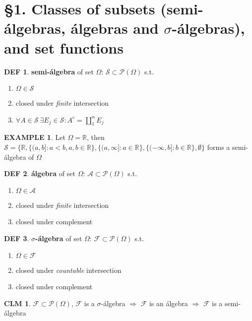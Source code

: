 \documentclass[hidelinks]{article}
\theoremstyle{definition}
\newtheorem*{defin}{DEF}
\newtheorem*{eg}{EXAMPLE}
\theoremstyle{dotless}
\newtheorem{claim}{CLM}[section]
\theoremstyle{remark}
\begin{document}
\newpage
\section*{\S1. Classes of subsets (semi-álgebras, álgebras and $\sigma$-álgebras), and set functions}
\setcounter{section}{1}

\begin{defin}
\textbf{semi-álgebra} of set $\Omega$: $\mathscr{S}\subset\mathscr{P}(\Omega)$ s.t.
\begin{enumerate}[label=\arabic*\degree]
    \item $\Omega\in\mathscr{S}$
    \item closed under \emph{finite} intersection
    \item $\forall A\in\mathscr{S}\ \exists E_j\in\mathscr{S}:A^c=\coprod\limits_1^nE_j$
\end{enumerate}
\end{defin}

\begin{eg}
Let $\Omega=\mathbb{R}$, then $\mathscr{S}=\{\mathbb{R},\{(a,b]:a<b,a,b\in \mathbb{R}\},\{(a,\infty]:a\in \mathbb{R}\},\{(-\infty,b]:b\in\mathbb{R}\},\emptyset\}$ forms a semi-álgebra of $\Omega$
\end{eg}

\begin{defin}
\textbf{álgebra} of set $\Omega$:
$\mathscr{A}\subset\mathscr{P}(\Omega)$ s.t.
\begin{enumerate}[label=\arabic*\degree]
    \item $\Omega\in\mathscr{A}$
    \item closed under \emph{finite} intersection
    \item closed under complement
\end{enumerate}
\end{defin}

\begin{defin}
\textbf{$\sigma$-álgebra} of set $\Omega$:
$\mathscr{F}\subset\mathscr{P}(\Omega)$ s.t.
\begin{enumerate}[label=\arabic*\degree]
    \item $\Omega\in\mathscr{F}$
    \item closed under \emph{countable} intersection
    \item closed under complement
\end{enumerate}
\end{defin}

\begin{claim}
$\mathscr{F}\subset\mathscr{P}(\Omega)$, $\mathscr{F}$ is a $\sigma$-álgebra $\Rightarrow$ $\mathscr{F}$ is an álgebra $\Rightarrow$ $\mathscr{F}$ is a semi-álgebra
\end{claim}
\end{document}
